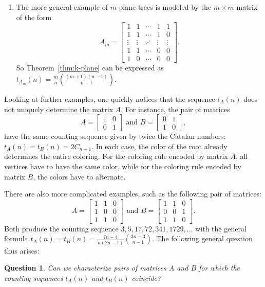 \documentclass[12pt]{amsart}
\newtheorem{question}{Question}
\begin{document}
\begin{enumerate}
\item The more general example of $m$-plane trees is modeled by the $m \times m$-matrix of the form
$$A_m = \begin{bmatrix} 1 & 1 & \cdots & 1 & 1 \\ 1 & 1 & \cdots & 1 & 0 \\ \vdots & \vdots & \iddots & \vdots & \vdots \\ 1 & 1 & \cdots & 0 & 0 \\ 1 & 0 & \cdots & 0 & 0  \end{bmatrix}.$$
So Theorem~\ref{thm:k-plane} can be expressed as $t_{A_m}(n) = \frac{m}{n} \binom{(m+1)(n-1)}{n-1}$.
\end{enumerate}

Looking at further examples, one quickly notices that the sequence $t_A(n)$ does not uniquely determine the matrix $A$. For instance, the pair of matrices
$$A = \begin{bmatrix} 1 & 0 \\ 0 & 1 \end{bmatrix} \text{ and } B = \begin{bmatrix} 0 & 1 \\ 1 & 0 \end{bmatrix},$$
have the same counting sequence given by twice the Catalan numbers: $t_A(n) = t_B(n) = 2C_{n-1}$. In each case, the color of the root already determines the entire coloring. For the coloring rule encoded by matrix $A$, all vertices have to have the same color, while for the coloring rule encoded by matrix $B$, the colors have to alternate.

There are also more complicated examples, such as the following pair of matrices:
$$A = \begin{bmatrix} 1 & 1 & 0 \\ 1 & 0 & 0 \\ 1 & 1 & 0 \end{bmatrix} \text{ and } B = \begin{bmatrix} 1 & 1 & 0 \\ 0 & 0 & 1 \\ 1 & 1 & 0 \end{bmatrix}.$$
Both produce the counting sequence $3, 5, 17, 72, 341, 1729,\ldots$
with the general formula $t_A(n) = t_B(n) = \frac{7 n - 4}{n (2 n - 1)} \binom{3n-3}{n-1}$. The following general question thus arises:

\begin{question}
Can we characterize pairs of matrices $A$ and $B$ for which the counting sequences $t_A(n)$ and $t_B(n)$ coincide?
\end{question}
\end{document}
